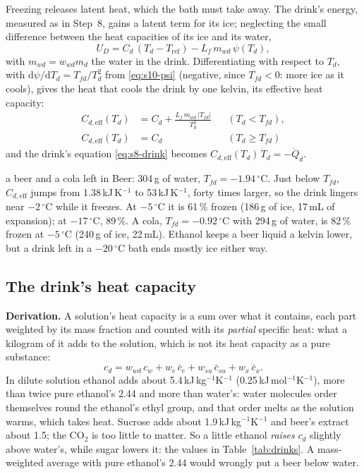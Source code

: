 \documentclass[11pt,a4paper]{article}
\newcommand{\dd}{\mathrm{d}}
\newcommand{\dC}{\,{}^{\circ}\mathrm{C}}
\newcommand{\Cdeff}{C_{d,\mathrm{eff}}}
\newcommand{\Tfd}{T_{fd}}
\newcommand{\para}[1]{\par\smallskip\noindent\textbf{#1}\enspace}
\begin{document}
Freezing releases latent heat, which the bath must take away. The drink's energy, measured as in Step~8,
gains a latent term for its ice; neglecting the small difference between the heat capacities of its ice and
its water,
\begin{equation}
U_D = C_d\,(T_d - T_{\mathrm{ref}}) - L_f\,m_{wd}\,\psi(T_d), \label{eq:s10-UD}
\end{equation}
with $m_{wd} = w_{wd}m_d$ the water in the drink. Differentiating with respect to $T_d$, with
$\dd\psi/\dd T_d = \Tfd/T_d^2$ from \eqref{eq:s10-psi} (negative, since $\Tfd < 0$: more ice as it cools),
gives the heat that cools the drink by one kelvin, its effective heat capacity:
\begin{equation}
\boxed{\begin{aligned}
\Cdeff(T_d) &= C_d + \frac{L_f\,m_{wd}\,|\Tfd|}{T_d^2} &&(T_d < \Tfd),\\
\Cdeff(T_d) &= C_d &&(T_d \ge \Tfd)
\end{aligned}} \label{eq:s10-Ceff}
\end{equation}
and the drink's equation \eqref{eq:s8-drink} becomes $\Cdeff(T_d)\,\dot T_d = -\dot Q_d$.

\begin{worked}{a beer and a cola left in}
Beer: 304\,g of water, $\Tfd = -1.94\dC$. Just below $\Tfd$, $\Cdeff$ jumps from 1.38\,kJ\,K$^{-1}$ to
53\,kJ\,K$^{-1}$, forty times larger, so the drink lingers near $-2\dC$ while it freezes. At $-5\dC$ it is
61\,\% frozen (186\,g of ice, 17\,mL of expansion); at $-17\dC$, 89\,\%. A cola, $\Tfd = -0.92\dC$ with 294\,g of
water, is 82\,\% frozen at $-5\dC$ (240\,g of ice, 22\,mL). Ethanol keeps a beer liquid a kelvin lower, but a
drink left in a $-20\dC$ bath ends mostly ice either way.
\end{worked}

\subsection{The drink's heat capacity}
\para{Derivation.} A solution's heat capacity is a sum over what it contains, each part weighted by its mass
fraction and counted with its \emph{partial} specific heat: what a kilogram of it adds to the solution,
which is not its heat capacity as a pure substance:
\begin{equation}
c_d = w_{wd}\,c_w + w_e\,\bar c_e + w_{su}\,\bar c_{su} + w_x\,\bar c_x . \label{eq:s10-cd}
\end{equation}
In dilute solution ethanol adds about 5.4\,kJ\,kg$^{-1}$K$^{-1}$ (0.25\,kJ\,mol$^{-1}$K$^{-1}$), more than twice
pure ethanol's 2.44 and more than water's: water molecules order themselves round the ethanol's ethyl group,
and that order melts as the solution warms, which takes heat. Sucrose adds about 1.9\,kJ\,kg$^{-1}$K$^{-1}$ and
beer's extract about 1.5; the CO$_2$ is too little to matter. So a little ethanol \emph{raises} $c_d$ slightly
above water's, while sugar lowers it: the values in Table~\ref{tab:drinks}. A mass-weighted average with
pure ethanol's 2.44 would wrongly put a beer below water.
\end{document}
